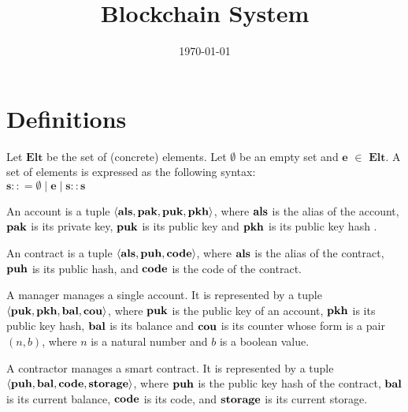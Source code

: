 \documentclass[a4paper]{llncs}
\title{Blockchain System}
\author{}
\institute{}
\date{\today}
\begin{document}
\maketitle
\pagestyle{plain}

\section{Definitions}
\begin{definition}[Set]
Let $\mathbf{Elt}$ be the set of (concrete) elements. Let $\emptyset$ be an empty set and $\mathbf{e}$ $\in$  $\mathbf{Elt}$. A set of elements is expressed as the following syntax:
\\
$\mathbf{s} :: = \emptyset \mid \mathbf{e} \mid \mathbf{s :: s}$
\end{definition}

\begin{definition}[Account]
An account is a tuple $\langle \textbf{als}, \textbf{pak}, \textbf{puk}, \textbf{pkh} \rangle $, where $\textbf{als}$ is the alias of the account, $\textbf{pak}$ is its private key, $\textbf{puk}$ is its public key and $\textbf{pkh}$ is its public key hash . 
\end{definition}

\begin{definition}[Contract]
An contract is a tuple $\langle  \textbf{als}, \textbf{puh}, \textbf{code} \rangle $, where
$\textbf{als}$ is the alias of the contract, $\textbf{puh}$ is its public hash, and
$\textbf{code}$ is the code of the contract. 
\end{definition}

\begin{definition}[Manager]
A manager manages a single account. It is represented by a
tuple $\langle  \textbf{puk}, \textbf{pkh}, \textbf{bal}, \textbf{cou} \rangle $, where  $\textbf{puk}$ is the
public key of an account, $\textbf{pkh}$ is its public key hash, $\textbf{bal}$ is its
balance and $\textbf{cou}$ is its counter whose form is a pair $(n, b)$, where $n$ is a natural number and ${b}$
is a boolean value.  
\end{definition}

\begin{definition}[Contractor]
  A contractor manages a smart contract. It is
  represented by a tuple
  $\langle \textbf{puh}, \textbf{bal}, \textbf{code}, \textbf{storage} \rangle $, where $\textbf{puh}$ is the
  public key hash of the contract, $\textbf{bal}$ is its current balance, $\textbf{code}$ is its
  code, and $\textbf{storage}$ is its current storage.
\end{definition}
\end{document}
